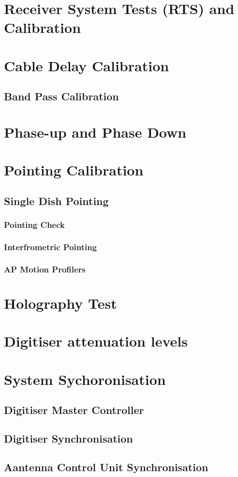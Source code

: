 \section{Receiver System Tests (RTS) and Calibration}

\section{Cable Delay Calibration}
\subsection{Band Pass Calibration}
\section{Phase-up and Phase Down}
\section{Pointing Calibration}
\subsection{Single Dish Pointing}
\subsubsection{Pointing Check}
\subsubsection{Interfrometric Pointing}
\subsubsection{AP Motion Profilers}
\section{Holography Test}


\section{Digitiser attenuation levels}
\section{System Sychoronisation}

\subsection{Digitiser Master Controller}
\subsection{Digitiser Synchronisation}
\subsection{Aantenna Control Unit Synchronisation}



	